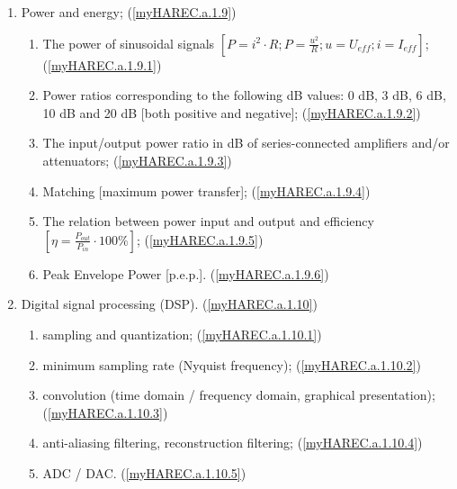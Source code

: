 \begin{enumerate}
\begin{enumerate}[noitemsep]
\item Power and energy; (\ref{myHAREC.a.1.9})\label{HAREC.a.1.9}
\begin{enumerate}[noitemsep]
\item The power of sinusoidal signals \(\left[P=i^2 \cdot R; P=\frac{u^2}{R}; u=U_{eff}; i=I_{eff}\right]\); (\ref{myHAREC.a.1.9.1})\label{HAREC.a.1.9.1}
\item Power ratios corresponding to the following dB values: 0 dB, 3 dB, 6 dB, 10 dB and 20 dB [both positive and negative]; (\ref{myHAREC.a.1.9.2})\label{HAREC.a.1.9.2}
\item The input/output power ratio in dB of series-connected amplifiers and/or attenuators; (\ref{myHAREC.a.1.9.3})\label{HAREC.a.1.9.3}
\item Matching [maximum power transfer]; (\ref{myHAREC.a.1.9.4})\label{HAREC.a.1.9.4}
\item The relation between power input and output and efficiency \(\left[\eta=\frac{P_{out}}{P_{in}}\cdot 100\%\right]\); (\ref{myHAREC.a.1.9.5})\label{HAREC.a.1.9.5}
\item Peak Envelope Power [p.e.p.]. (\ref{myHAREC.a.1.9.6})\label{HAREC.a.1.9.6}
\end{enumerate}

\item Digital signal processing (DSP). (\ref{myHAREC.a.1.10})\label{HAREC.a.1.10}
\begin{enumerate}[noitemsep]
\item sampling and quantization; (\ref{myHAREC.a.1.10.1})\label{HAREC.a.1.10.1}
\item minimum sampling rate (Nyquist frequency); (\ref{myHAREC.a.1.10.2})\label{HAREC.a.1.10.2}
\item convolution (time domain / frequency domain, graphical presentation); (\ref{myHAREC.a.1.10.3})\label{HAREC.a.1.10.3}
\item anti-aliasing filtering, reconstruction filtering; (\ref{myHAREC.a.1.10.4})\label{HAREC.a.1.10.4}
\item ADC / DAC. (\ref{myHAREC.a.1.10.5})\label{HAREC.a.1.10.5}
\end{enumerate}

\end{enumerate}


\end{enumerate}
